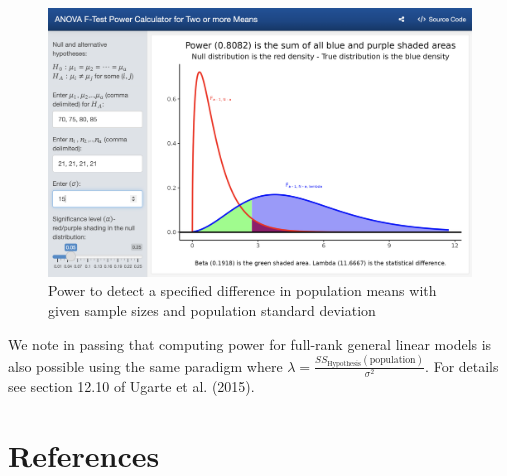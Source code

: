 \documentclass[
]{article}
\begin{document}
\begin{figure}

{\centering \includegraphics[width=5.86in]{fig-power4} 

}

\caption{Power to detect a specified difference in population means with given sample sizes and population standard deviation}\label{fig:power4}
\end{figure}

We note in passing that computing power for full-rank general linear models is also possible using the same paradigm where \(\lambda = \frac{SS_\text{Hypothesis}(\text{population})}{\sigma^2}\). For details see section 12.10 of Ugarte et al. (2015).

\hypertarget{references}{%
\section*{References}\label{references}}
\end{document}
